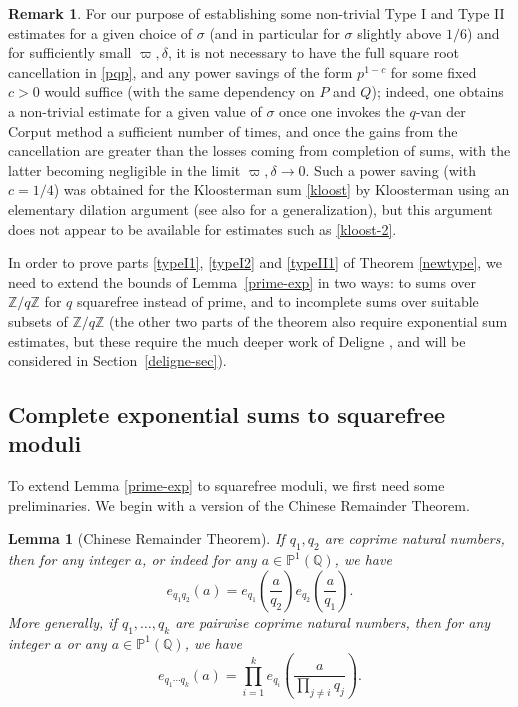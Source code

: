 \documentclass[12pt,a4paper,reqno]{amsart}
\numberwithin{equation}{section}
\theoremstyle{plain}
\newtheorem{lemma}[theorem]{Lemma}
\theoremstyle{definition}
\newtheorem{remark}[theorem]{Remark}
\newcommand\Z{\mathbb{Z}}
\newcommand\Q{\mathbb{Q}}
\renewcommand\P{\mathbb{P}}
\begin{document}
\begin{remark} For our purpose of establishing some non-trivial Type I
  and Type II estimates for a given choice of $\sigma$ (and in
  particular for $\sigma$ slightly above $1/6$) and for sufficiently small $\varpi,\delta$, it is not necessary
  to have the full square root cancellation in \eqref{pqp}, and any
  power savings of the form $p^{1-c}$ for some fixed $c>0$ would
  suffice (with the same dependency on $P$ and $Q$); indeed, one obtains a non-trivial estimate for a given value of $\sigma$ once one invokes the $q$-van der Corput method a sufficient number of times, and once the gains from the cancellation are greater than the losses coming from completion of sums, with the latter becoming negligible in the limit $\varpi,\delta \to 0$.  Such a power
  saving (with $c=1/4$) was obtained for the Kloosterman sum
  \eqref{kloost} by Kloosterman \cite{Kloosterman} using an elementary
  dilation argument (see also \cite{mordell} for a generalization),
  but this argument does not appear to be available for estimates such
  as \eqref{kloost-2}.
\end{remark} 


In order to prove parts \eqref{typeI1}, \eqref{typeI2} and
\eqref{typeII1} of Theorem \ref{newtype}, we need to extend the bounds
of Lemma~\ref{prime-exp} in two ways: to sums over $\Z/q\Z$ for $q$
squarefree instead of prime, and to incomplete sums over suitable
subsets of $\Z/q\Z$ (the other two parts of the theorem also require
exponential sum estimates, but these require the much deeper work of
Deligne \cite{WeilII}, and will be considered in
Section~\ref{deligne-sec}).

\subsection{Complete exponential sums to squarefree moduli}

To extend Lemma \ref{prime-exp} to squarefree moduli, we first need
some preliminaries. We begin with a version of the Chinese Remainder
Theorem.

\begin{lemma}[Chinese Remainder Theorem]\label{crt}  If $q_1,q_2$ are
  coprime natural numbers, then for any integer $a$, or indeed for any
  $a\in \P^1(\Q)$, we have
\begin{equation}\label{eq-crt-easy}
e_{q_1 q_2}(a) = e_{q_1}\left(\frac{a}{q_2}\right) e_{q_2}\left(
  \frac{a}{q_1} \right).
\end{equation}
More generally, if $q_1,\ldots,q_k$ are pairwise coprime natural
numbers, then for any integer $a$ or any $a\in\P^1(\Q)$, we have
$$ 
e_{q_1 \cdots q_k}(a) = \prod_{i=1}^k e_{q_i}\left(\frac{a}{\prod_{j
      \neq i} q_j}\right).
$$
\end{lemma}
\end{document}

